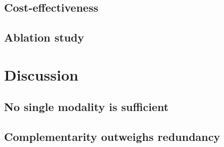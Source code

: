 \documentclass[12pt]{article}
\begin{document}
{\subsection{Cost-effectiveness}


\subsection{Ablation study}





\section{Discussion}

\subsection{No single modality is sufficient}


\subsection{Complementarity outweighs redundancy}

}
\end{document}
